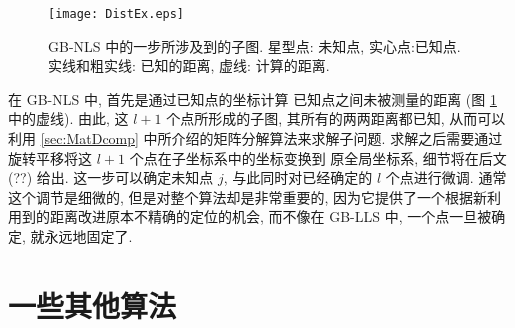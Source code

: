 \begin{figure}[htb!]
  \centering
  \texttt{[image: DistEx.eps]}\\
  \caption{GB-NLS 中的一步所涉及到的子图. 星型点: 未知点, 实心点:已知点.
  实线和粗实线: 已知的距离, 虚线: 计算的距离.}\label{fig:DistEx}
\end{figure}

在 GB-NLS 中, 首先是通过已知点的坐标计算
已知点之间未被测量的距离 (图 \ref{fig:DistEx} 中的虚线).
由此, 这 $l+1$ 个点所形成的子图, 其所有的两两距离都已知, 
从而可以利用 \ref{sec:MatDcomp} 中所介绍的矩阵分解算法来求解子问题.
求解之后需要通过旋转平移将这 $l+1$ 个点在子坐标系中的坐标变换到
原全局坐标系, 细节将在后文 (??) 给出.
这一步可以确定未知点 $j$, 与此同时对已经确定的 $l$ 个点进行微调. 
通常这个调节是细微的, 但是对整个算法却是非常重要的,
因为它提供了一个根据新利用到的距离改进原本不精确的定位的机会,
而不像在 GB-LLS 中, 一个点一旦被确定, 就永远地固定了.


\section{一些其他算法}
\label{sec:otheralg}





